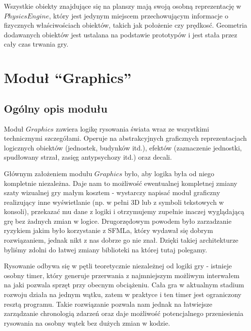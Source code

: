 \documentclass[licencjacka]{pracamgr}
\begin{document}
    Wszystkie obiekty znajdujące się na planszy mają swoją osobną reprezentację w $PhysicsEngine$, który jest jedynym miejscem
    przechowującym informacje o fizycznych właściwościach obiektów, takich jak położenie czy prędkosć. Geometria dodawanych obiektów
    jest ustalana na podstawie prototypów i jest stała przez cały czas trwania gry.
  \section{Moduł ``Graphics''}
    \subsection{Ogólny opis modułu}
      Moduł $Graphics$ zawiera logikę rysowania świata wraz ze wszystkimi technicznymi szczegółami. Operuje na
      abstrakcyjnych graficznych reprezentacjach logicznych obiektów (jednostek, budynków itd.), efektów (zaznaczenie
      jednostki, spudłowany strzał, zasięg antypsychozy itd.) oraz decali.

      Głównym założeniem modułu $Graphics$ było, aby logika była od niego kompletnie niezależna. Daje nam to możliwość
      ewentualnej kompletnej zmiany szaty wizualnej gry małym kosztem - wystarczy napisać moduł graficzny realizujący
      inne wyświetlanie (np. w pełni 3D lub z symboli tekstowych w konsoli), przekazać mu dane z logiki i otrzymujemy
      zupełnie inaczej wyglądającą grę bez żadnych zmian w logice. Drugorzędowym powodem było zarzadzanie ryzykiem jakim
      było korzystanie z SFMLa, który wydawał się dobrym rozwiązaniem, jednak nikt z nas dobrze go nie znał. Dzięki
      takiej architekturze byliśmy zdolni do łatwej zmiany biblioteki na której tutaj polegamy.

      Rysowanie odbywa się w pętli teoretycznie niezależnej od logiki gry - istnieje osobny timer, który generuje
      przerwania z najmniejszym możliwym interwałem na jaki pozwala sprzęt przy obecnym obciążeniu. Cała gra w aktualnym
      stadium rozwoju działa na jednym wątku, zatem w praktyce i ten timer jest ograniczony resztą programu. Takie
      rozwiązanie pozwala nam jednak na łatwiejsze zarządzanie chronologią zdarzeń oraz daje możliwość potencjalnego
      przeniesienia rysowania na osobny wątek bez dużych zmian w kodzie.
\end{document}
